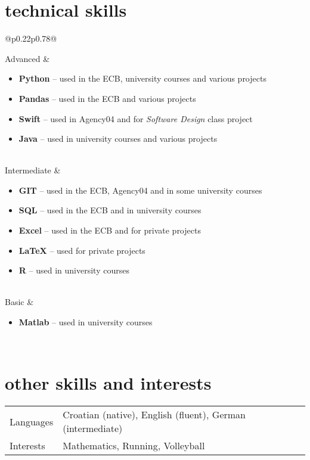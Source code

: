 \documentclass[a4paper]{article}
\makeatletter
\newlength{\tablewidth}
\newenvironment{skills}{%
\setlength{\tablewidth}{\linewidth}
\addtolength{\tablewidth}{-2\tabcolsep}
\begin{tabular}{@{}p{0.22\tablewidth}p{0.78\tablewidth}@{}}
}{%
\end{tabular}
}
\makeatother
\begin{document}
\section{technical skills}
\begin{skills}
    Advanced &
    \begin{itemize}
        \item \textbf{Python} -- used in the ECB, university courses and various projects
        \item \textbf{Pandas} -- used in the ECB and various projects
        \item \textbf{Swift} -- used in Agency04 and for \textit{Software Design} class project
        \item \textbf{Java} -- used in university courses and various projects

    \end{itemize} \\
    Intermediate &
    \begin{itemize}
        \item \textbf{GIT} -- used in the ECB, Agency04 and in some university courses
        \item \textbf{SQL} -- used in the ECB and in university courses
        \item \textbf{Excel} -- used in the ECB and for private projects
        \item \textbf{LaTeX} -- used for private projects
        \item \textbf{R} -- used in university courses

    \end{itemize} \\
    Basic &
    \begin{itemize}
        \item \textbf{Matlab} -- used in university courses
    \end{itemize} \\
\end{skills}

\section{other skills and interests}
\begin{skills}
    Languages & Croatian (native), English (fluent), German (intermediate) \\
    Interests & Mathematics, Running, Volleyball \\
\end{skills}
\end{document}
